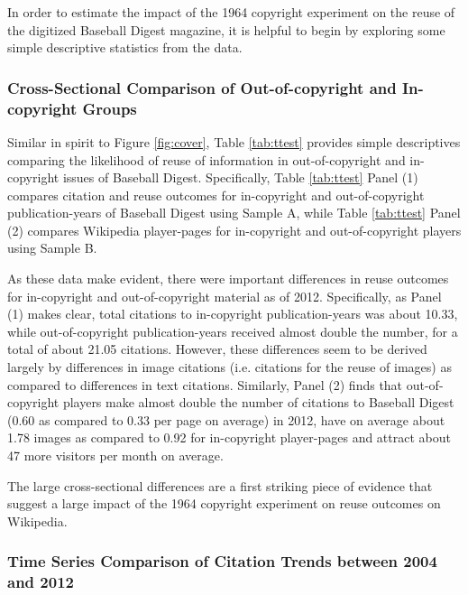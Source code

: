 \documentclass[11pt]{article}
\begin{document}
In order to estimate the impact of the 1964 copyright experiment on the reuse of the digitized Baseball Digest magazine, it is helpful to begin by exploring some simple descriptive statistics from the data.

\subsubsection{Cross-Sectional Comparison of Out-of-copyright and In-copyright Groups}

Similar in spirit to Figure \ref{fig:cover}, Table \ref{tab:ttest} provides simple descriptives comparing the likelihood of reuse of information in out-of-copyright and in-copyright issues of Baseball Digest. Specifically, Table \ref{tab:ttest} Panel (1) compares citation and reuse outcomes for in-copyright and out-of-copyright publication-years of Baseball Digest using Sample A, while Table \ref{tab:ttest} Panel (2) compares Wikipedia player-pages for in-copyright and out-of-copyright players using Sample B.

As these data make evident, there were important differences in reuse outcomes for in-copyright and out-of-copyright material as of 2012. Specifically, as Panel (1) makes clear, total citations to in-copyright publication-years was about 10.33, while out-of-copyright publication-years received almost double the number, for a total of about 21.05 citations. However, these differences seem to be derived largely by differences in image citations (i.e. citations for the reuse of images) as compared to differences in text citations. Similarly, Panel (2) finds that out-of-copyright players make almost double the number of citations to Baseball Digest (0.60 as compared to 0.33 per page on average) in 2012, have on average about 1.78 images as compared to 0.92 for in-copyright player-pages and attract about 47 more visitors per month on average.

The large cross-sectional differences are a first striking piece of evidence that suggest a large impact of the 1964 copyright experiment on reuse outcomes on Wikipedia.

\subsubsection{Time Series Comparison of Citation Trends between 2004 and 2012}
\end{document}
